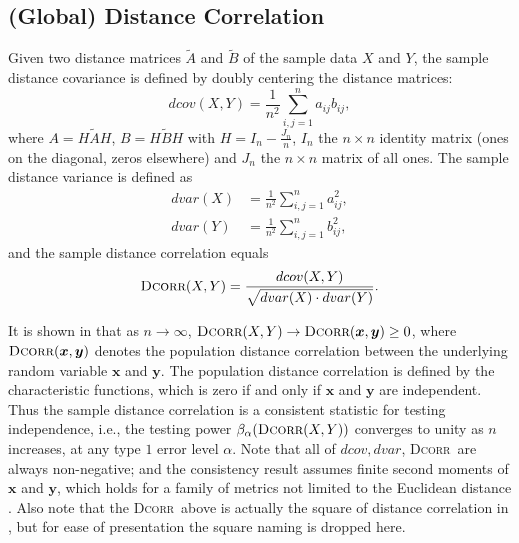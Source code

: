 \documentclass[11pt]{article}
\providecommand{\sct}[1]{{\normalfont\textsc{#1}}}
\providecommand{\mb}[1]{\boldsymbol{#1}}
\newcommand{\Dcorr}{\sct{Dcorr}}
\begin{document}
\subsection{(Global) Distance Correlation}
\label{appen:dcorr}
Given two distance matrices $\tilde{A}$ and $\tilde{B}$ of the sample data $X$ and $Y$, the sample distance covariance is defined by doubly centering the distance matrices:
\begin{equation*}
\label{dcovEqu}
dcov(X,Y)=\frac{1}{n^2}\sum_{i,j=1}^{n}a_{ij}b_{ij},
\end{equation*}
where $A=H\tilde{A}H$, $B=H\tilde{B}H$ with $H=I_{n}-\frac{J_{n}}{n}$, $I_n$ the $n \times n$ identity matrix (ones on the diagonal, zeros elsewhere)  and $J_n$ the $n \times n$ matrix of all ones. The sample distance variance is defined as
\begin{align*}
dvar(X) &=\frac{1}{n^2}\sum_{i,j=1}^{n}a_{ij}^{2},\\
dvar(Y) &=\frac{1}{n^2}\sum_{i,j=1}^{n}b_{ij}^{2},
\end{align*}
and the sample distance correlation equals
\begin{equation*}
\Dcorr(X,Y)=\frac{dcov(X,Y)}{\sqrt{dvar(X) \cdot dvar(Y)}}.
\end{equation*}

It is shown in \cite{SzekelyRizzoBakirov2007} that as $n \rightarrow \infty$, $\Dcorr(X,Y) \rightarrow \Dcorr(\mb{x},\mb{y}) \geq 0$, where $\Dcorr(\mb{x},\mb{y})$ denotes the population distance correlation between the underlying random variable $\mb{x}$ and $\mb{y}$. The population distance correlation is defined by the characteristic functions, which is zero if and only if $\mb{x}$ and $\mb{y}$ are independent. Thus the sample distance correlation is a consistent statistic for testing independence, i.e., the testing power $\beta_{\alpha}(\Dcorr(X,Y))$
converges to unity as $n$ increases, at any type $1$ error level $\alpha$. Note that all of $dcov, dvar$, \Dcorr~are always non-negative; and the consistency result assumes finite second moments of $\mb{x}$ and $\mb{y}$, which holds for a family of metrics not limited to the Euclidean distance \cite{Lyons2013}. Also note that the \Dcorr~above is actually the square of distance correlation in \cite{SzekelyRizzoBakirov2007}, but for ease of presentation the square naming is dropped here.
\end{document}
